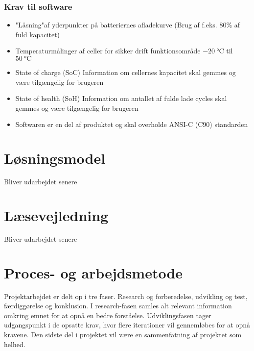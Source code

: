 \subsubsection{Krav til software}
\begin{itemize}[noitemsep]
	\item "Låsning"\space af yderpunkter på batteriernes afladekurve (Brug af f.eks. 80\% af fuld kapacitet)
	\item Temperaturmålinger af celler for sikker drift \textemdash \space funktionsområde $\SI{-20}{\celsius}$ til $\SI{50}{\celsius}$
	\item State of charge (SoC) \textemdash \space Information om cellernes kapacitet skal gemmes og være tilgængelig for brugeren
	\item State of health (SoH) \textemdash \space Information om antallet af fulde lade cycles skal gemmes og være tilgængelig for brugeren
	\item Softwaren er en del af produktet og skal overholde ANSI-C (C90) standarden
\end{itemize}


\section{Løsningsmodel}
Bliver udarbejdet senere

\section{Læsevejledning}
Bliver udarbejdet senere

\section{Proces- og arbejdsmetode}
Projektarbejdet er delt op i tre faser. Research og forberedelse, udvikling og test, færdiggørelse og konklusion. I research-fasen samles alt relevant information omkring emnet for at opnå en bedre forståelse. Udviklingsfasen tager udgangspunkt i de opsatte krav, hvor flere iterationer vil gennemløbes for at opnå kravene. Den sidste del i projektet vil være en sammenfatning af projektet som helhed.




